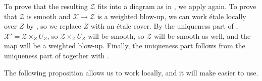 \documentclass{amsart}
\newcommand{\cX}{\mathcal{X}}
\newcommand{\cZ}{\mathcal{Z}}
\theoremstyle{definition}
\begin{document}

To prove that the resulting $\cZ$ fits into a diagram as in , we apply  again. To prove that $\cZ$ is smooth and $\cX\to \cZ$ is a weighted blow-up, we can work \'etale locally over $Z$ by , so we replace $Z$ with an \'etale cover. By the uniqueness part of , $\cX'=\cZ\times_Z U_Z$, so $\cZ\times_Z U_Z$ will be smooth, so $\cZ$ will be smooth as well, and the map will be a weighted blow-up.
Finally, the uniqueness part follows from the uniqueness part of  together with .

The following proposition allows us to work locally, and it will make  easier to use.
\end{document}
